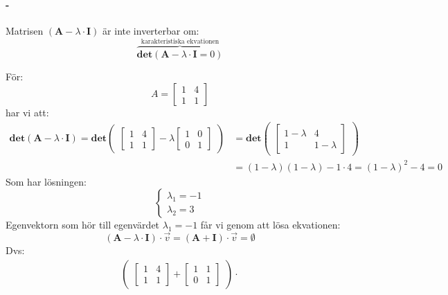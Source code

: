 \paragraph{-} %
\label{par:_}
Matrisen $(\mathbf{A} - \lambda \cdot \mathbf{I})$ är inte inverterbar om:
\[
\overbrace{\mathbf{det}(\mathbf{A} - \lambda \cdot \mathbf{I} = 0)}^\text{karakteristiska ekvationen}
\]
\begin{Ex}
	För:
	\[
	A = \begin{bmatrix} 1&4\\1&1 \end{bmatrix}
	\]
	har vi att:
	\begin{align*}
	\mathbf{det}(\mathbf{A} - \lambda \cdot \mathbf{I}) = \mathbf{det}\begin{pmatrix} \begin{bmatrix} 1&4\\1&1 \end{bmatrix} - \lambda \begin{bmatrix} 1&0\\0&1 \end{bmatrix} \end{pmatrix} &= \mathbf{det}\begin{pmatrix} \begin{bmatrix} 1 - \lambda & 4\\1 & 1 - \lambda \end{bmatrix} \end{pmatrix} \\
	&= (1 - \lambda)(1 - \lambda) - 1 \cdot 4 = (1 - \lambda)^2 - 4 = 0
	\end{align*}
	Som har lösningen:
	\[
	\begin{cases}
		\lambda_1 = -1\\
		\lambda_2 = 3
	\end{cases}
	\]
	Egenvektorn som hör till egenvärdet $\lambda_1 = -1$ får vi genom att lösa ekvationen:
	\[
	(\mathbf{A} - \lambda \cdot \mathbf{I}) \cdot \vec{v} = (\mathbf{A} + \mathbf{I}) \cdot \vec{v} = \emptyset
	\]
	Dvs:
	\begin{align*}
		\begin{pmatrix}
			\begin{bmatrix}
				1 & 4\\
				1 & 1 
			\end{bmatrix} + 
			\begin{bmatrix} 
				1 & 1\\
				0 & 1 
			\end{bmatrix}
		\end{pmatrix} \cdot 

\end{align*}
\end{Ex}

